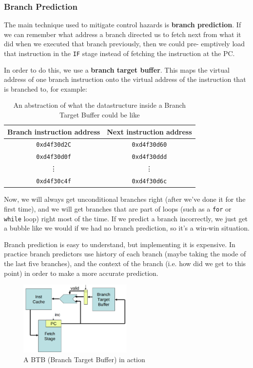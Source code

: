 \subsubsection{Branch Prediction}

The main technique used to mitigate control hazards is \textbf{branch
prediction}. If we can remember what address a branch directed us to fetch next
from what it did when we executed that branch previously, then we could pre-
emptively load that instruction in the \texttt{IF} stage instead of fetching the
instruction at the PC.

In order to do this, we use a \textbf{branch target buffer}. This maps the
virtual address of one branch instruction onto the virtual address of the
instruction that is branched to, for example:

\begin{table}[ht]
  \centering
  \begin{tabular}{|c|c|}
    \hline
    \textbf{Branch instruction address} & \textbf{Next instruction address} \\ \hline
    \texttt{0xd4f30d2C} & \texttt{0xd4f30d60} \\ \hline
    \texttt{0xd4f30d0f} & \texttt{0xd4f30ddd} \\ \hline
    \multicolumn{1}{c}{\vdots} & \multicolumn{1}{c}{\vdots\vspace{0.2em}}\\ \hline
    \texttt{0xd4f30c4f} & \texttt{0xd4f30d6c} \\ \hline
  \end{tabular}
  \caption{An abstraction of what the datastructure inside a Branch Target
  Buffer could be like}
\end{table}

Now, we will always get unconditional branches right (after we've done it for
the first time), and we will get branches that are part of loops (such as a
\texttt{for} or \texttt{while} loop) right most of the time. If we predict a
branch incorrectly, we just get a bubble like we would if we had no branch
prediction, so it's a win-win situation.

Branch prediction is easy to understand, but implementing it is expensive. In
practice branch predictors use history of each branch (maybe taking the mode of
the last five branches), and the context of the branch (i.e. how did we get to
this point) in order to make a more accurate prediction.

\begin{figure}[ht]
  \centering
  \includegraphics[width=0.5\textwidth]{images/branch-target-buffer}
  \caption{A BTB (Branch Target Buffer) in action}
  \label{branch-target-buffer}
\end{figure}

